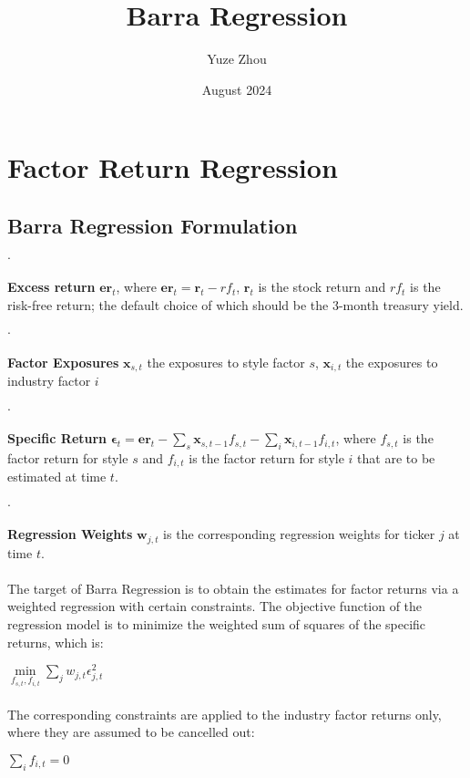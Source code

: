 \documentclass{article}
\title{Barra Regression}
\author{Yuze Zhou}
\date{August 2024}
\begin{document}
\section{Factor Return Regression}
\subsection{Barra Regression Formulation}
\paragraph{$\cdot$}\textbf{Excess return} $\mathbf{er}_{t}$, where $\mathbf{er}_{t} = \mathbf{r}_{t} - rf_{t}$, $ \mathbf{r}_{t}$ is the stock return and $rf_{t}$ is the risk-free return; the default choice of which should be the 3-month treasury yield. 
\paragraph{$\cdot$} \textbf{Factor Exposures} $\mathbf{x}_{s,t}$ the exposures to style factor $s$, $\mathbf{x}_{i,t}$ the exposures to industry factor $i$
\paragraph{$\cdot$}\textbf{Specific Return} $\mathbf{\epsilon}_{t} = \mathbf{er}_{t} - \sum\limits_{s}\mathbf{x}_{s,t-1} f_{s,t} - \sum\limits_{i}\mathbf{x}_{i,t-1} f_{i, t}$, where $f_{s, t}$ is the factor return for style $s$ and $f_{i,t}$ is the factor return for style $i$ that are to be estimated at time $t$.
\paragraph{$\cdot$} \textbf{Regression Weights} $\mathbf{w}_{j,t}$ is the corresponding regression weights for ticker $j$ at time $t$.
\paragraph{}The target of Barra Regression is to obtain the estimates for factor returns via a weighted regression with certain constraints. The objective function of the regression model is to minimize the weighted sum of squares of the specific returns, which is:
\begin{center}
    $\min\limits_{f_{s,t}, f_{i,t}} \sum\limits_{j}w_{j,t} \epsilon_{j,t}^{2}$
\end{center}
\paragraph{}The corresponding constraints are applied to the industry factor returns only, where they are assumed to be cancelled out:
\begin{center}
    $\sum\limits_{i}f_{i,t} = 0$
\end{center}
\end{document}
